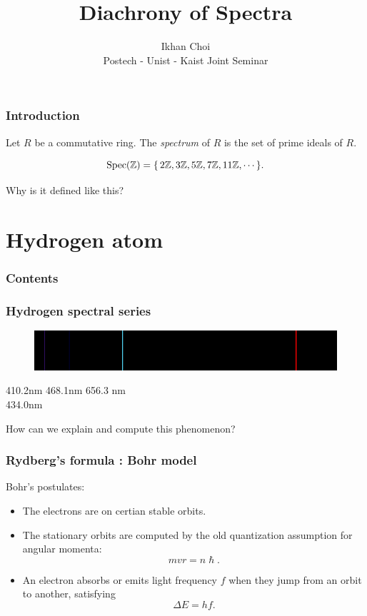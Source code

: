 \documentclass{beamer}
\title{Diachrony of Spectra}
\author{Ikhan Choi \\ Postech - Unist - Kaist Joint Seminar}
\begin{document}
\maketitle

\begin{frame}
\frametitle{Introduction}
  \pause
  \begin{defn}
    Let $R$ be a commutative ring.
    The \emph{spectrum} of $R$ is the set of prime ideals of $R$.
  \end{defn}
  \pause
  \begin{ex}
  	\[\operatorname{Spec}(\mathbb{Z})=\{\,2\mathbb{Z},3\mathbb{Z},5\mathbb{Z},7\mathbb{Z},11\mathbb{Z},\cdots\,\}.\]
  \end{ex}
  \pause
  \begin{qn}
    Why is it defined like this?
  \end{qn}
\end{frame}


\section{Hydrogen atom}

\begin{frame}
\frametitle{Contents}
  \tableofcontents[currentsection]
\end{frame}

\begin{frame}
\frametitle{Hydrogen spectral series}
  \begin{figure}\includegraphics[scale=.4]{emission.png}\end{figure}
  \pause 410.2nm \hspace{2em} 468.1nm \hspace{12em} 656.3 nm\\ \hspace{2em} 434.0nm\\
  \bigskip
  \pause
  \begin{qn}
    How can we explain and compute this phenomenon?
  \end{qn}
\end{frame}

\begin{frame}
\frametitle{Rydberg's formula : Bohr model}
  Bohr's postulates:\pause
  \begin{itemize}[<+->]
    \item The electrons are on certian stable orbits.
    \item The stationary orbits are computed by the old quantization assumption for angular momenta:
    \[mvr=n\hslash.\]
    \item An electron absorbs or emits light frequency $f$ when they jump from an orbit to another, satisfying
    \[\Delta E=hf.\]
  \end{itemize}
\end{frame}
\end{document}
